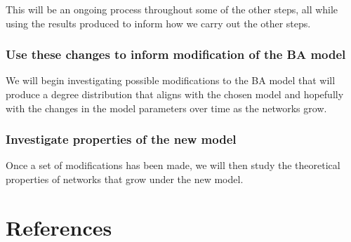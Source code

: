 \documentclass[
]{article}
\begin{document}
This will be an ongoing process throughout some of the other steps, all
while using the results produced to inform how we carry out the other
steps.

\hypertarget{use-these-changes-to-inform-modification-of-the-ba-model}{%
\subsubsection*{Use these changes to inform modification of the BA
model}\label{use-these-changes-to-inform-modification-of-the-ba-model}}

We will begin investigating possible modifications to the BA model that
will produce a degree distribution that aligns with the chosen model and
hopefully with the changes in the model parameters over time as the
networks grow.

\hypertarget{investigate-properties-of-the-new-model}{%
\subsubsection*{Investigate properties of the new
model}\label{investigate-properties-of-the-new-model}}

Once a set of modifications has been made, we will then study the
theoretical properties of networks that grow under the new model.

\newpage{}

\hypertarget{references}{%
\section*{References}\label{references}}
\end{document}
